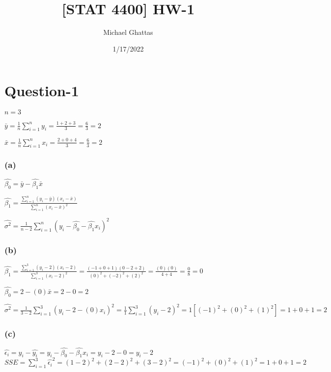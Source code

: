 \documentclass[
]{article}
\title{{[}STAT 4400{]} HW-1}
\author{Michael Ghattas}
\date{1/17/2022}
\begin{document}
\maketitle

\hypertarget{question-1}{%
\section{Question-1}\label{question-1}}

\(n = 3\)

\(\bar{y} = \frac{1}{n}\sum_{i = 1}^{n}y_i = \frac{1 + 2 + 3}{3} = \frac{6}{3} = 2\)

\(\bar{x} = \frac{1}{n}\sum_{i = 1}^{n}x_i = \frac{2 + 0 + 4}{3} = \frac{6}{3} = 2\)

\hypertarget{a}{%
\subsubsection{(a)}\label{a}}

\(\hat{\beta_0} = \bar{y} - \hat{\beta_1}\bar{x}\)

\(\hat{\beta_1} = \frac{\sum_{i = 1}^{n}(y_i - \bar{y})(x_i - \bar{x})}{\sum_{i = 1}^{n}(x_i - \bar{x})^2}\)

\(\hat{\sigma^2} = \frac{1}{n - 2}\sum_{i = 1}^{n}(y_i - \hat{\beta_0} - \hat{\beta_1}x_i)^2\)

\hypertarget{b}{%
\subsubsection{(b)}\label{b}}

\(\hat{\beta_1} = \frac{\sum_{i = 1}^{3}(y_i - 2)(x_i - 2)}{\sum_{i = 1}^{3}(x_i - 2)^2} = \frac{(-1 + 0 + 1)(0 - 2 + 2)}{(0)^2 + (-2)^2 + (2)^2} = \frac{(0)(0)}{4 + 4} = \frac{0}{8} = 0\)

\(\hat{\beta_0} = 2 - (0)\bar{x} = 2 - 0 = 2\)

\(\hat{\sigma^2} = \frac{1}{3 - 2}\sum_{i = 1}^{3}(y_i - 2 - (0)x_i)^2 = \frac{1}{1}\sum_{i = 1}^{3}(y_i - 2)^2 = 1[(-1)^2 + (0)^2 + (1)^2] = 1 + 0 + 1 = 2\)

\hypertarget{c}{%
\subsubsection{(c)}\label{c}}

\(\hat{\epsilon_i} = y_i - \hat{y_i} = y_i - \hat{\beta_0} - \hat{\beta_1}x_i = y_i - 2 - 0 = y_i - 2\)
\(SSE = \sum_{i = 1}^{3}\hat{\epsilon_i}^2 = (1 - 2)^2 + (2 - 2)^2 + (3 - 2)^2 = (-1)^2 + (0)^2 + (1)^2 = 1 + 0 + 1 = 2\)
\end{document}
